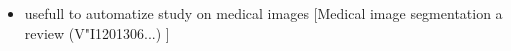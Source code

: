 \documentclass[../main.tex]{subfiles}
\begin{document}
\begin{itemize}

    \item usefull to automatize study on medical images [Medical image segmentation a review (V"I1201306...) \cite{segmentation_review_1}]
   
\end{itemize}
\end{document}
